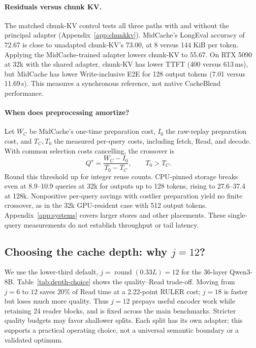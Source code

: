 \paragraph{Residuals versus chunk KV.}
The matched chunk-KV control tests all three paths with and without the principal adapter (Appendix~\ref{app:chunkkv}). MidCache's LongEval accuracy of 72.67 is close to unadapted chunk-KV's 73.00, at 8 versus 144 KiB per token. Applying the MidCache-trained adapter lowers chunk-KV to 55.67. On RTX 5090 at 32k with the shared adapter, chunk-KV has lower TTFT (400 versus 613\,ms), but MidCache has lower Write-inclusive E2E for 128 output tokens (7.01 versus 11.69\,s). This measures a synchronous reference, not native CacheBlend performance.

\paragraph{When does preprocessing amortize?}
Let $W_C$ be MidCache's one-time preparation cost, $I_0$ the raw-replay preparation cost, and $T_C,T_0$ the measured per-query costs, including fetch, Read, and decode. With common selection costs cancelling, the crossover is
\begin{equation}
 Q^\star=\frac{W_C-I_0}{T_0-T_C},\qquad T_0>T_C.
 \label{eq:breakeven}
\end{equation}
Round this threshold up for integer reuse counts. CPU-pinned storage breaks even at 8.9--10.9 queries at 32k for outputs up to 128 tokens, rising to 27.6--37.4 at 128k. Nonpositive per-query savings with costlier preparation yield no finite crossover, as in the 32k GPU-resident case with 512 output tokens. Appendix~\ref{app:systems} covers larger stores and other placements. These single-query measurements do not establish throughput or tail latency.

\subsection{Choosing the cache depth: why $j=12$?}
\label{sec:depth-choice}
We use the lower-third default, $j=\operatorname{round}(0.33L)=12$ for the 36-layer Qwen3-8B. Table~\ref{tab:depth-choice} shows the quality--Read trade-off. Moving from $j=6$ to $12$ saves 20\% of Read time at a 2.22-point RULER cost; $j=18$ is faster but loses much more quality. Thus $j=12$ prepays useful encoder work while retaining 24 reader blocks, and is fixed across the main benchmarks. Stricter quality budgets may favor shallower splits. Each split has its own adapter; this supports a practical operating choice, not a universal semantic boundary or a validated optimum.


